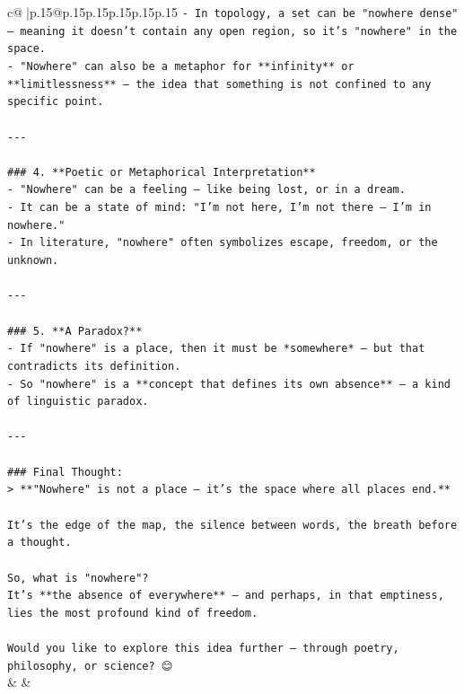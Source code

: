 \documentclass{article}
\begin{document}
{\begin{supertabular}{c@{$\;$}|p{.15\linewidth}@{}p{.15\linewidth}p{.15\linewidth}p{.15\linewidth}p{.15\linewidth}p{.15\linewidth}}
{{{\texttt{{-} In topology, a set can be "nowhere dense" — meaning it doesn’t contain any open region, so it’s "nowhere" in the space.} \\
\texttt{{-} "Nowhere" can also be a metaphor for **infinity** or **limitlessness** — the idea that something is not confined to any specific point.} \\
\\ 
\texttt{{-}{-}{-}} \\
\\ 
\texttt{\#\#\# 4. **Poetic or Metaphorical Interpretation**} \\
\texttt{{-} "Nowhere" can be a feeling — like being lost, or in a dream.} \\
\texttt{{-} It can be a state of mind: "I’m not here, I’m not there — I’m in nowhere."} \\
\texttt{{-} In literature, "nowhere" often symbolizes escape, freedom, or the unknown.} \\
\\ 
\texttt{{-}{-}{-}} \\
\\ 
\texttt{\#\#\# 5. **A Paradox?**} \\
\texttt{{-} If "nowhere" is a place, then it must be *somewhere* — but that contradicts its definition.} \\
\texttt{{-} So "nowhere" is a **concept that defines its own absence** — a kind of linguistic paradox.} \\
\\ 
\texttt{{-}{-}{-}} \\
\\ 
\texttt{\#\#\# Final Thought:} \\
\texttt{> **"Nowhere" is not a place — it’s the space where all places end.**} \\
\\ 
\texttt{It’s the edge of the map, the silence between words, the breath before a thought.} \\
\\ 
\texttt{So, what is "nowhere"?  } \\
\texttt{It’s **the absence of everywhere** — and perhaps, in that emptiness, lies the most profound kind of freedom.} \\
\\ 
\texttt{Would you like to explore this idea further — through poetry, philosophy, or science? 😊} \\
            }
        }
    }
    & & \\ \\


\end{supertabular}}
\end{document}
